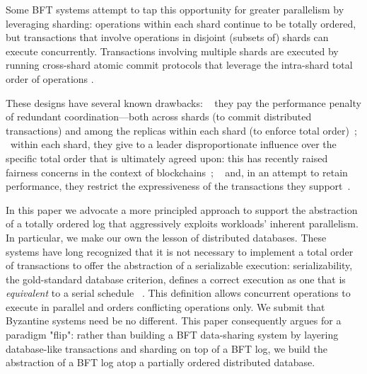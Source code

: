 Some BFT systems attempt to tap this opportunity for greater parallelism by leveraging sharding: operations within each shard continue to be totally ordered, but transactions that involve operations in disjoint (subsets of) shards can execute concurrently. Transactions involving  multiple shards are executed by running cross-shard atomic commit protocols that leverage the intra-shard total order of operations \cite{kokoris2018omniledger, al2017chainspace, zamani2018rapidchain, padilha2013augustus, padilha2016callinicos}. 

These designs have several known drawbacks: \one~ they pay the performance penalty of  redundant coordination---both across shards (to commit distributed transactions) and among the replicas within each shard (to enforce total order)~\cite{zhang2016operation, zhang2015tapir, mu2016consolidating}; \two~within each shard,  they give to a leader disproportionate influence over the specific total order that is ultimately agreed upon: this has recently raised fairness concerns in the context of blockchains~\cite{herlihy2016enhancing, yin2019hotstuff}; \three~ and, in an attempt to retain performance, they restrict the expressiveness of the transactions they support~\cite{padilha2013augustus, padilha2016callinicos}. 

 

In this paper we advocate a more principled approach to support the abstraction of a totally ordered log that aggressively exploits workloads' inherent parallelism. In particular, we  make our own the lesson of distributed databases.  These systems have long recognized that it is not necessary to implement a total order of transactions to offer the abstraction of a serializable execution: serializability, the gold-standard database criterion, defines a correct execution as one that is \textit{equivalent} to a serial schedule ~\cite{bernstein1979fas,Papadimitriou1979serializability,bernstein1979fas}.  This definition allows concurrent operations to execute in parallel and orders conflicting operations only.  We submit that Byzantine systems need be no different. This paper consequently argues for a paradigm "flip": rather than building a BFT data-sharing system by layering database-like transactions and sharding on top of a BFT log, we build the abstraction of a BFT log atop a partially ordered distributed database.



